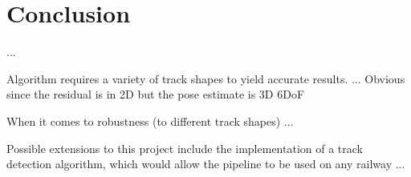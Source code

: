 \chapter{Conclusion}
\label{chapter:conclusion}


...

Algorithm requires a variety of track shapes to yield accurate results. ...
Obvious since the residual is in 2D but the pose estimate is 3D 6DoF


When it comes to robustness (to different track shapes) ...


Possible extensions to this project include the implementation of a track detection algorithm, which would allow the pipeline to be used on any railway ...
